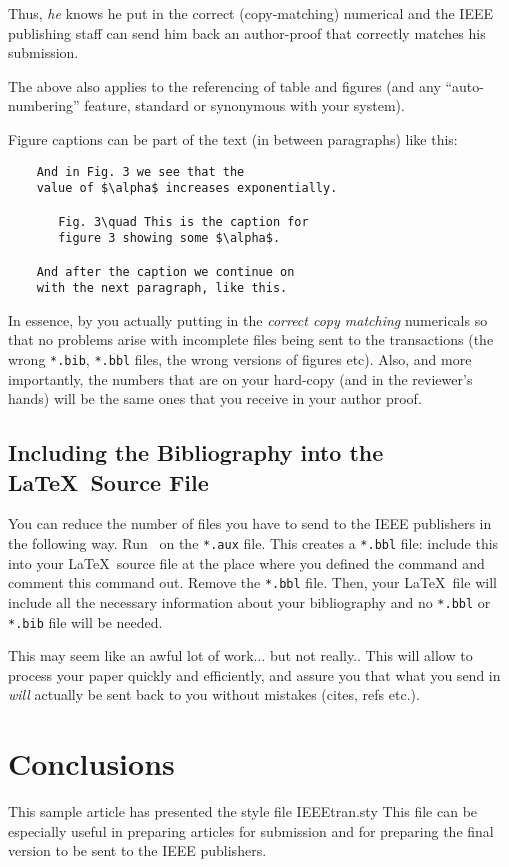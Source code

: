 Thus, {\em he\/} knows he put in the correct (copy-matching) numerical and
the IEEE publishing staff can send him back an author-proof
that correctly matches his submission.

The above also applies to the referencing of table and figures
(and any ``auto-numbering'' feature, standard or synonymous with your system).

Figure captions can be part of the text (in between paragraphs) like this:

\begin{verbatim}
    And in Fig. 3 we see that the
    value of $\alpha$ increases exponentially.

       Fig. 3\quad This is the caption for
       figure 3 showing some $\alpha$.

    And after the caption we continue on
    with the next paragraph, like this.
\end{verbatim}

In essence, by you actually putting in the {\em correct copy
matching\/} numericals so that no problems arise with incomplete files
being sent to the transactions (the wrong \verb+*.bib+, \verb+*.bbl+ files,
the wrong versions of figures etc).  Also, and more importantly, the
numbers that are on your hard-copy (and in the reviewer's hands) will
be the same ones that you receive in your author proof.

\subsection{Including the Bibliography into the \LaTeX\ Source File}
You can reduce the number of files you have to send to the IEEE
publishers in the following way. Run \BibTeX\ on the
\verb+*.aux+ file. This creates a \verb+*.bbl+ file: include this
into your \LaTeX\ source file at the place where you defined the
\verb++ command  and comment this command out.
Remove the \verb+*.bbl+ file.  Then, your \LaTeX\ file will include
all the necessary information about your bibliography and no \verb+*.bbl+
or \verb+*.bib+ file will be needed.

This may seem like an awful lot of work... but not really..
This will allow to process your paper quickly and efficiently, and assure you
that what you send in {\em will\/} actually be sent back to you
without  mistakes (cites, refs etc.).

\section{Conclusions}
This sample article has presented the style file IEEEtran.sty
This file can be especially useful in preparing articles for
submission and for preparing the final version to be sent to the IEEE
publishers.

